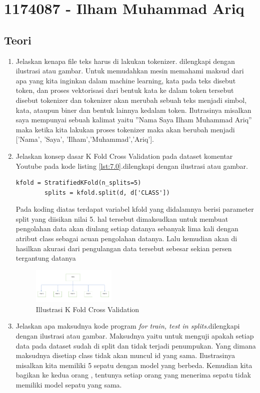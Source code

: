 \section{1174087 - Ilham Muhammad Ariq}
\subsection{Teori}
\begin{enumerate}
\item Jelaskan kenapa file teks harus di lakukan tokenizer. dilengkapi dengan ilustrasi atau gambar. 
	\hfill \break	
	Untuk memudahkan mesin memahami maksud dari apa yang kita inginkan dalam machine learning, kata pada teks disebut token, dan proses vektorisasi dari bentuk kata ke dalam token tersebut disebut tokenizer dan tokenizer akan merubah sebuah teks menjadi simbol, kata, ataupun biner dan bentuk lainnya kedalam token. Ilutrasinya misalkan saya mempunyai sebuah kalimat yaitu ”Nama Saya Ilham Muhammad Ariq” maka ketika kita lakukan proses tokenizer maka akan berubah menjadi ['Nama', 'Saya', 'Ilham','Muhammad','Ariq'].

	\item Jelaskan konsep dasar K Fold Cross Validation pada dataset komentar Youtube pada kode listing \ref{lst:7.0}.dilengkapi dengan ilustrasi atau gambar.
	\hfill \break
	\begin{lstlisting}[caption=K Fold Cross Validation,label={lst:7.0}]
		kfold = StratifiedKFold(n_splits=5)
		splits = kfold.split(d, d['CLASS'])
	\end{lstlisting}
	Pada koding diatas terdapat variabel kfold yang didalamnya berisi parameter split yang diisikan nilai 5. hal tersebut dimaksudkan untuk membuat pengolahan data akan diulang setiap datanya sebanyak lima kali dengan atribut class sebagai acuan pengolahan datanya. Lalu kemudian akan di hasilkan akurasi dari pengulangan data tersebut sebesar sekian persen tergantung datanya
	\begin{figure}[H]
    	\includegraphics[width=4cm]{figures/1174087/7/1.png}
    	\centering
    	\caption{Illustrasi K Fold Cross Validation}
	\end{figure}
	\item Jelaskan apa maksudnya kode program \emph{for train, test in splits}.dilengkapi dengan ilustrasi atau gambar.
	\hfill \break
	Maksudnya yaitu untuk menguji apakah setiap data pada dataset sudah di split dan tidak terjadi penumpukan. Yang dimana maksudnya disetiap class tidak akan muncul id yang sama. Ilustrasinya misalkan kita memiliki 5 sepatu dengan model yang berbeda. Kemudian kita bagikan ke kedua orang , tentunya setiap orang yang menerima sepatu tidak memiliki model sepatu yang sama.


\end{enumerate}
